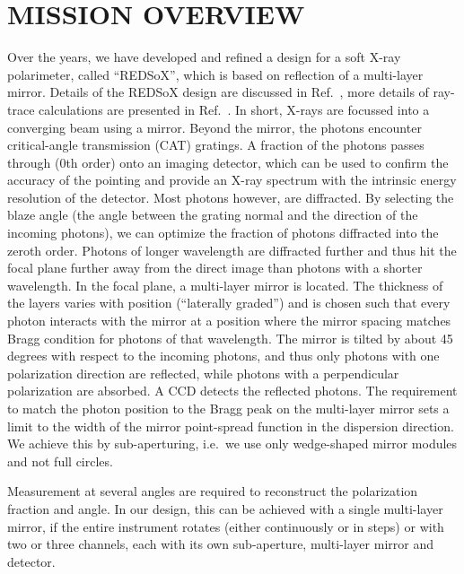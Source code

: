 \documentclass[]{spie}  %
\begin{document}
\section{MISSION OVERVIEW}
Over the years, we have developed and refined a design for a soft X-ray polarimeter, called ``REDSoX'', which is based on reflection of a multi-layer mirror.  
Details of the REDSoX design are discussed in Ref.~, more details of ray-trace calculations are presented in Ref.~.
In short, X-rays are focussed into a converging beam using a mirror. Beyond the mirror, the photons encounter critical-angle transmission (CAT) gratings. A fraction of the photons passes through (0th order) onto an imaging detector, which can be used to confirm the accuracy of the pointing and provide an X-ray spectrum with the intrinsic energy resolution of the detector. Most photons however, are diffracted. By selecting the blaze angle (the angle between the grating normal and the direction of the incoming photons), we can optimize the fraction of photons diffracted into the zeroth order. Photons of longer wavelength are diffracted further and thus hit the focal plane further away from the direct image than photons with a shorter wavelength. In the focal plane, a multi-layer mirror is located. The thickness of the layers varies with position (``laterally graded'') and is chosen such that every photon interacts with the mirror at a position where the mirror spacing matches Bragg condition for photons of that wavelength. The mirror is tilted by about 45 degrees with respect to the incoming photons, and thus only photons with one polarization direction are reflected, while photons with a perpendicular polarization are absorbed. A CCD detects the reflected photons. The requirement to match the photon position to the Bragg peak on the multi-layer mirror sets a limit to the width of the mirror point-spread function in the dispersion direction. We achieve this by sub-aperturing, i.e.\ we use only wedge-shaped mirror modules and not full circles.

Measurement at several angles are required to reconstruct the polarization fraction and angle. In our design, this can be achieved with a single multi-layer mirror, if the entire instrument rotates (either continuously or in steps) or with two or three channels, each with its own sub-aperture, multi-layer mirror and detector.
\end{document}
